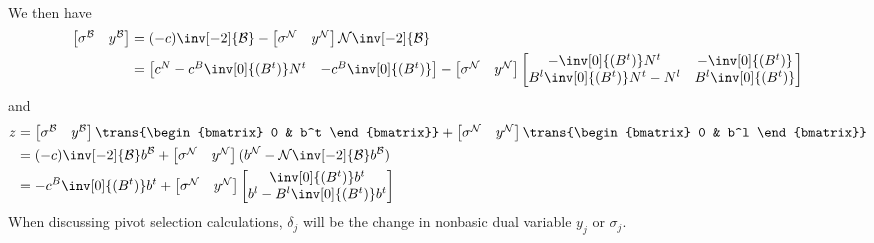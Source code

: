We then have
\begin{equation}
\begin{split}
\begin{bmatrix} \sigma^\mathcal{B} & y^\mathcal{B} \end{bmatrix} & =
    (-c)\inv[-2]{\mathcal{B}} -
    \begin{bmatrix} \sigma^\mathcal{N} & y^\mathcal{N} \end{bmatrix}
    \mathcal{N}\inv[-2]{\mathcal{B}} \\
& = \begin{bmatrix}
      c^N - c^B \inv[0]{(B^t)} N^t & -c^B \inv[0]{(B^t)}
    \end{bmatrix} -
    \begin{bmatrix} \sigma^\mathcal{N} & y^\mathcal{N} \end{bmatrix}
    \begin{bmatrix}
      -\inv[0]{(B^t)} N^t & -\inv[0]{(B^t)} \\
      B^l\inv[0]{(B^t)} N^t - N^l & B^l\inv[0]{(B^t)}
    \end{bmatrix} \label{Eqn:DualBasicVars}
\end{split}
\end{equation}
and
\begin{equation}
\begin{split}
z & = \begin{bmatrix} \sigma^\mathcal{B} & y^\mathcal{B} \end{bmatrix}
      \trans{\begin{bmatrix} 0 & b^t \end{bmatrix}} +
      \begin{bmatrix} \sigma^\mathcal{N} & y^\mathcal{N} \end{bmatrix}
      \trans{\begin{bmatrix} 0 & b^l \end{bmatrix}} \\
  & = (-c)\inv[-2]{\mathcal{B}} b^\mathcal{B} +
      \begin{bmatrix} \sigma^\mathcal{N} & y^\mathcal{N} \end{bmatrix}
      (b^\mathcal{N} - \mathcal{N}\inv[-2]{\mathcal{B}} b^\mathcal{B}) \\
  & = -c^B \inv[0]{(B^t)} b^t +
      \begin{bmatrix} \sigma^\mathcal{N} & y^\mathcal{N} \end{bmatrix}
      \begin{bmatrix}
	\inv[0]{(B^t)} b^t \\ b^l - B^l\inv[0]{(B^t)} b^t
      \end{bmatrix}
\end{split} \label{Eqn:DualObj}
\end{equation}
When discussing pivot selection calculations, $\delta_j$ will be the
change in nonbasic dual variable $y_j$ or $\sigma_j$.

